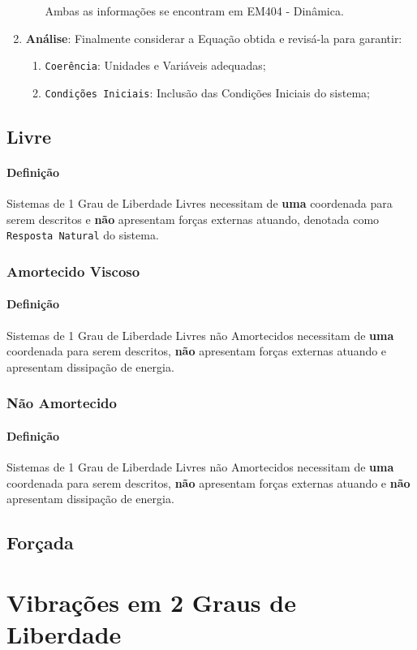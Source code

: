 \documentclass{article}
\begin{document}
\begin{enumerate}[rightmargin = \leftmargin]
\begin{enumerate}[rightmargin = \leftmargin, noitemsep]
            Ambas as informações se encontram em EM404 - Dinâmica.
        \end{enumerate}

        \item \textbf{Análise}: Finalmente considerar a Equação obtida e revisá-la para garantir:
        \begin{enumerate}[rightmargin = \leftmargin, noitemsep]
            \item \texttt{Coerência}: Unidades e Variáveis adequadas;
            \item \texttt{Condições Iniciais}: Inclusão das Condições Iniciais do sistema;
        \end{enumerate}
    \end{enumerate}




\newpage\subsection{Livre}
    \paragraph{Definição}Sistemas de 1 Grau de Liberdade Livres necessitam de \textbf{uma} coordenada para serem descritos e \textbf{não} apresentam forças externas atuando, denotada como \texttt{Resposta Natural} do sistema.

\subsubsection{Amortecido Viscoso}
    \paragraph{Definição}Sistemas de 1 Grau de Liberdade Livres não Amortecidos necessitam de \textbf{uma} coordenada para serem descritos, \textbf{não} apresentam forças externas atuando e apresentam dissipação de energia.

\subsubsection{Não Amortecido}
    \paragraph{Definição}Sistemas de 1 Grau de Liberdade Livres não Amortecidos necessitam de \textbf{uma} coordenada para serem descritos, \textbf{não} apresentam forças externas atuando e \textbf{não} apresentam dissipação de energia.




\newpage\subsection{Forçada}



\newpage\section{Vibrações em 2 Graus de Liberdade}
\end{document}
